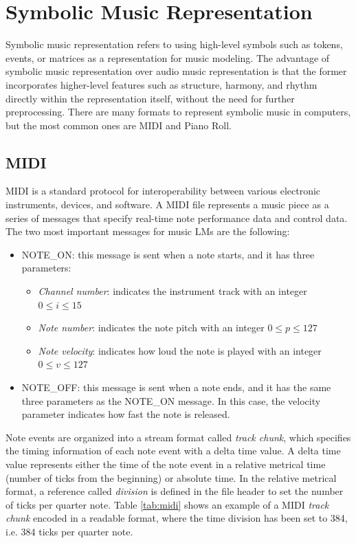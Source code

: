 \section{Symbolic Music Representation}

Symbolic music representation refers to using high-level symbols such as tokens, events, or matrices as a representation for music modeling. The advantage of symbolic music representation over audio music representation is that the former incorporates higher-level features such as structure, harmony, and rhythm directly within the representation itself, without the need for further preprocessing. There are many formats to represent symbolic music in computers, but the most common ones are MIDI and Piano Roll.

\subsection{MIDI}
MIDI is a standard protocol for interoperability between various electronic instruments, devices, and software. A MIDI file represents a music piece as a series of messages that specify real-time note performance data and control data. The two most important messages for music LMs are the following:

\begin{itemize}
  \item NOTE\_ON: this message is sent when a note starts, and it has three parameters:
  \begin{itemize}
      \item \textit{Channel number}: indicates the instrument track with an integer $0 \leq i \leq 15$
      \item \textit{Note number}: indicates the note pitch with an integer $0 \leq p \leq 127$
      \item \textit{Note velocity}: indicates how loud the note is played with an integer
      $0 \leq v \leq 127$
  \end{itemize}

  \item NOTE\_OFF: this message is sent when a note ends, and it has the same three parameters as the
  NOTE\_ON message. In this case, the velocity parameter indicates how fast the note is released.
\end{itemize}

Note events are organized into a stream format called \textit{track chunk}, which specifies the timing information of each note event with a delta time value. A delta time value represents either the time of the note event in a relative metrical time (number of ticks from the beginning) or absolute time. In the relative metrical format, a reference called \textit{division} is defined in the file header to set the number of ticks per quarter note. Table \ref{tab:midi} shows an example of a MIDI \textit{track chunk} encoded in a readable format, where the time division has been set to 384, i.e. 384 ticks per quarter note.

